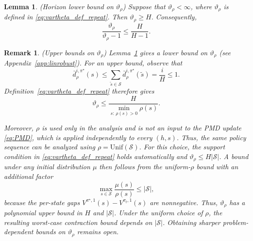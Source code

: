 \documentclass[11pt]{article}
\newtheorem{lem}{Lemma}
\newtheorem{rem}{Remark}
\begin{document}
\begin{lem}(Horizon lower bound on $\vartheta_\rho$)
\label{lem:vartheta_rho_ge_H}
Suppose that $\vartheta_\rho<\infty$, where $\vartheta_\rho$ is defined in
\eqref{eq:vartheta_def_repeat}. Then $\vartheta_\rho\ge H$. Consequently,
\begin{equation}
\label{eq:ratio_vartheta_by_H}
\frac{\vartheta_\rho}{\vartheta_\rho-1}
\le
\frac{H}{H-1}.
\end{equation}
\end{lem}

\begin{rem}(Upper bounds on $\vartheta_\rho$)
\label{rem:vartheta_upper_bound}
Lemma~\ref{lem:vartheta_rho_ge_H} gives a lower bound on
$\vartheta_\rho$ (see Appendix~\ref{app:linrobust}). For an upper bound, observe that
\[
\bar d^{i,\pi^\star}_\rho(s)
\le
\sum_{\tilde s\in\mathcal S}
\bar d^{i,\pi^\star}_\rho(\tilde s)
=
\frac{i}{H}
\le 1.
\]
Definition~\eqref{eq:vartheta_def_repeat} therefore gives
\[
\vartheta_\rho
\le
\frac{H}{\min_{s:\,\rho(s)>0}\rho(s)}.
\]

Moreover, $\rho$ is used only in the analysis and is not an input to the PMD
update \eqref{eq:PMD}, which is applied independently to every $(h,s)$. Thus,
the same policy sequence can be analyzed using
$\rho=\mathrm{Unif}(\mathcal S)$. For this choice, the support condition in
\eqref{eq:vartheta_def_repeat} holds automatically and
$\vartheta_\rho\le H|\mathcal S|$. A bound under any initial distribution
$\mu$ then follows from the uniform-$\rho$ bound with an additional factor
\[
\max_{s\in\mathcal S}\frac{\mu(s)}{\rho(s)}
\le
|\mathcal S|,
\]
because the per-state gaps
$V^{\pi^\star,1}(s)-V^{\pi_t,1}(s)$ are nonnegative. Thus, $\vartheta_\rho$ has a polynomial upper bound in $H$ and
$|\mathcal S|$. Under the uniform choice of $\rho$, the resulting worst-case
contraction bound depends on $|\mathcal S|$. Obtaining sharper problem-dependent bounds on
$\vartheta_\rho$ remains open.
\end{rem}
\end{document}
